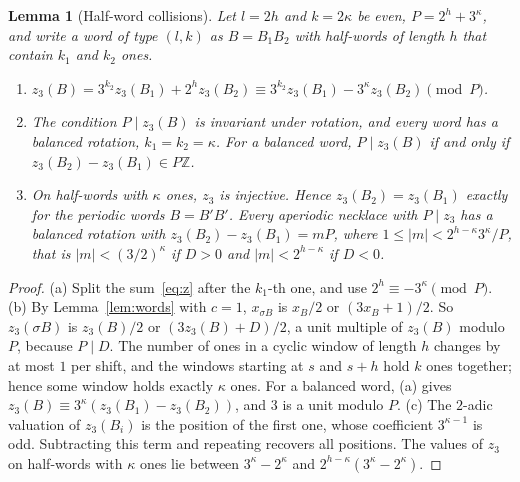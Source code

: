 \documentclass[12pt]{amsart}
\newtheorem{lemma}{Lemma}
\theoremstyle{definition}
\theoremstyle{remark}
\newcommand{\Z}{\mathbb{Z}}
\begin{document}
\begin{lemma}[Half-word collisions]
\label{lem:halfword}
Let $l=2h$ and $k=2\kappa$ be even, $P=2^h+3^\kappa$, and write a word of type $(l,k)$ as $B=B_1B_2$ with half-words of length $h$ that contain $k_1$ and $k_2$ ones.
\begin{enumerate}[label=(\alph*)]
\item $z_3(B)=3^{k_2}z_3(B_1)+2^hz_3(B_2)\equiv3^{k_2}z_3(B_1)-3^\kappa z_3(B_2)\pmod P$.
\item The condition $P\mid z_3(B)$ is invariant under rotation, and every word has a balanced rotation, $k_1=k_2=\kappa$. For a balanced word, $P\mid z_3(B)$ if and only if $z_3(B_2)-z_3(B_1)\in P\Z$.
\item On half-words with $\kappa$ ones, $z_3$ is injective. Hence $z_3(B_2)=z_3(B_1)$ exactly for the periodic words $B=B'B'$. Every aperiodic necklace with $P\mid z_3$ has a balanced rotation with $z_3(B_2)-z_3(B_1)=mP$, where $1\le|m|<2^{h-\kappa}3^\kappa/P$, that is $|m|<(3/2)^\kappa$ if $D>0$ and $|m|<2^{h-\kappa}$ if $D<0$.
\end{enumerate}
\end{lemma}

\begin{proof}
(a) Split the sum~\eqref{eq:z} after the $k_1$-th one, and use $2^h\equiv-3^\kappa\pmod P$. (b) By Lemma~\ref{lem:words} with $c=1$, $x_{\sigma B}$ is $x_B/2$ or $(3x_B+1)/2$. So $z_3(\sigma B)$ is $z_3(B)/2$ or $(3z_3(B)+D)/2$, a unit multiple of $z_3(B)$ modulo $P$, because $P\mid D$. The number of ones in a cyclic window of length $h$ changes by at most $1$ per shift, and the windows starting at $s$ and $s+h$ hold $k$ ones together; hence some window holds exactly $\kappa$ ones. For a balanced word, (a) gives $z_3(B)\equiv3^\kappa(z_3(B_1)-z_3(B_2))$, and $3$ is a unit modulo $P$. (c) The $2$-adic valuation of $z_3(B_i)$ is the position of the first one, whose coefficient $3^{\kappa-1}$ is odd. Subtracting this term and repeating recovers all positions. The values of $z_3$ on half-words with $\kappa$ ones lie between $3^\kappa-2^\kappa$ and $2^{h-\kappa}(3^\kappa-2^\kappa)$.
\end{proof}
\end{document}
